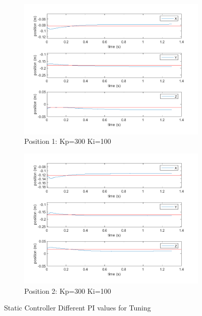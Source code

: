 \begin{figure}[ht]
    \vspace{2pt} %

    \begin{subfigure}[b]{0.45\textwidth}
        \centering
        \includegraphics[width=\linewidth]{Pictures/Controller/Kp300Ki100/1.png}
        \caption{Position 1: Kp=300 Ki=100}
    \end{subfigure}%
    \hfill
    \begin{subfigure}[b]{0.45\textwidth}
        \centering
        \includegraphics[width=\linewidth]{Pictures/Controller/Kp300Ki100/17.png}
        \caption{Position 2: Kp=300 Ki=100}
    \end{subfigure}

    \caption{Static Controller Different PI values for Tuning}
    \label{fig:staticPItuning}
\end{figure}


